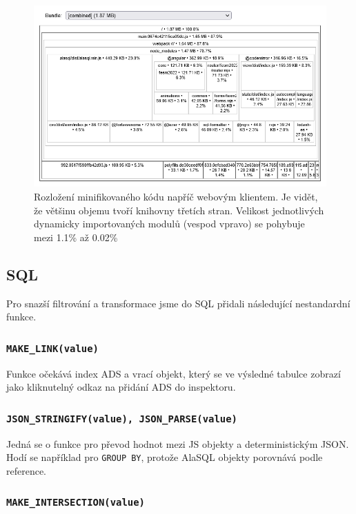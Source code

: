 \begin{figure}
  \centering
  \includegraphics[width=1\linewidth]{img/sourcemaps.png}
  \caption{Rozložení minifikovaného kódu napříč webovým klientem. Je vidět, že většinu objemu tvoří knihovny třetích stran. Velikost jednotlivých dynamicky importovaných modulů (vespod vpravo) se pohybuje mezi 1.1\% až 0.02\%}
  \label{fig:sourcemaps}
\end{figure}

\subsection{SQL}

Pro snazší filtrování a transformace jsme do SQL přidali následující nestandardní funkce.

\subsubsection*{\protect\lstinline|MAKE_LINK(value)|}

Funkce očekává index ADS a vrací objekt, který se ve výsledné tabulce zobrazí jako kliknutelný odkaz na přidání ADS do inspektoru.

\subsubsection*{\protect\lstinline|JSON_STRINGIFY(value), JSON_PARSE(value)|}

Jedná se o funkce pro převod hodnot mezi JS objekty a deterministickým JSON. Hodí se například pro \lstinline|GROUP BY|, protože AlaSQL objekty porovnává podle reference.

\subsubsection*{\protect\lstinline|MAKE_INTERSECTION(value)|}
\label{sql:make_intersection}

